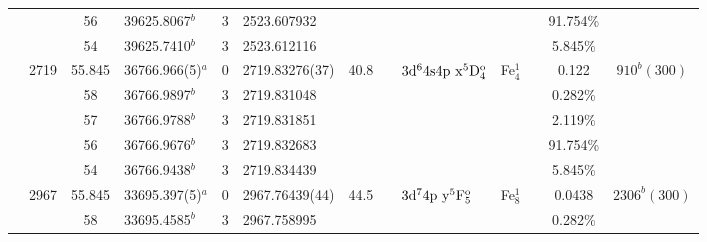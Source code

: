 \begin{table*}
\begin{center}
{\begin{tabular}{:l;l;c;l;c;l;c;l;l;c;c;c;c}
\rowstyle{\itshape}               &        & 56        & 39625.8067$^{b}$                 & 3 &   2523.607932      &      & $                                        $ & $                                        $ &             &              & 91.754\%  & $     ^{}     $\\
\rowstyle{\itshape}               &        & 54        & 39625.7410$^{b}$                 & 3 &   2523.612116      &      & $                                        $ & $                                        $ &             &              & 5.845\%   & $     ^{}     $\\
                                  & 2719   & 55.845    & 36766.966(5)$^{a}$               & 0 &    2719.83276(37)  & 40.8 & $                                        $ & $3\rm{d}^64\rm{s}4\rm{p~x}^5\rm{D}_{4}^{\rm o}$ & Fe$^1_{4}$  &              & 0.122     & $  910^{b}(300)$\\
\rowstyle{\itshape}               &        & 58        & 36766.9897$^{b}$                 & 3 &   2719.831048      &      & $                                        $ & $                                        $ &             &              & 0.282\%   & $     ^{}     $\\
\rowstyle{\itshape}               &        & 57        & 36766.9788$^{b}$                 & 3 &   2719.831851      &      & $                                        $ & $                                        $ &             &              & 2.119\%   & $     ^{}     $\\
\rowstyle{\itshape}               &        & 56        & 36766.9676$^{b}$                 & 3 &   2719.832683      &      & $                                        $ & $                                        $ &             &              & 91.754\%  & $     ^{}     $\\
\rowstyle{\itshape}               &        & 54        & 36766.9438$^{b}$                 & 3 &   2719.834439      &      & $                                        $ & $                                        $ &             &              & 5.845\%   & $     ^{}     $\\
                                  & 2967   & 55.845    & 33695.397(5)$^{a}$               & 0 &    2967.76439(44)  & 44.5 & $                                        $ & $3\rm{d}^74\rm{p~y}^5\rm{F}_{5}^{\rm o}  $ & Fe$^1_{8}$  &              & 0.0438    & $ 2306^{b}(300)$\\
\rowstyle{\itshape}               &        & 58        & 33695.4585$^{b}$                 & 3 &   2967.758995      &      & $                                        $ & $                                        $ &             &              & 0.282\%   & $     ^{}     $\\

\end{tabular}}
\end{center}
\end{table*}
